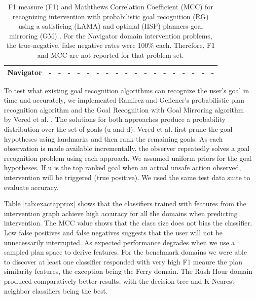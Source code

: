 \documentclass[letterpaper]{article}
\theoremstyle{plain}
\begin{document}
\begin{table}[tb]
{\begin{tabular}{|l|ll|ll|ll|ll|ll|ll|ll|ll|ll|}
\textbf{Navigator}                            & -                       & -                        & -                       & -   & -                       & -   & -                        & -   & -                       & -   & -                       & -   & -                        & -   & -                       & -   & -                       & -   \\ \hline
\end{tabular}%
}
\caption{F1 measure (F1) and Maththews Correlation Coefficient (MCC) for recognizing intervention with probabilistic goal recognition (RG)  \cite{ramirez2010probabilistic} using a satisficing (LAMA) and optimal (HSP) planners goal mirroring (GM) \cite{vered2018goalrec}. For the Navigator domain intervention problems, the true-negative, false negative rates were 100\%  each. Therefore, F1 and MCC are not reported for that problem set.}
\label{tab:rgv}
\end{table}

To test what existing goal recognition algorithms can recognize the user's goal in time and accurately, we implemented Ramirez and Geffener's probabilistic plan recognition algorithm \cite{ramirez2010probabilistic} and the Goal Recognition with Goal Mirroring algorithm by Vered et al. . The solutions for both approaches produce a probability distribution over the set of goals ($\mathrm{u}$ and $\mathrm{d}$). Vered et al. first prune the goal hypotheses using landmarks and then rank the remaining goals. As each observation is made available incrementally, the observer repeatedly solves a goal recognition problem using each approach. We assumed uniform priors for the goal hypotheses. If $\mathrm{u}$ is the top ranked goal when an actual unsafe action observed, intervention will be triggered (true positive). We used the same test data suite to evaluate accuracy.

Table \ref{tab:exactapprox} shows that the classifiers trained with features from the intervention graph achieve high accuracy for all the domains when predicting intervention. The MCC value shows that the class size does not bias the classifier. Low false positives and false negatives suggests that the user will not be unnecessarily interrupted. As expected performance degrades when we use a sampled plan space to derive features. For the benchmark domains we were able to discover at least one classifier responded with very high F1 meaure the plan similarity features, the exception being the Ferry domain. The Rush Hour domain produced comparatively better results, with the decision tree and K-Nearest neighbor classifiers being the best. 
\end{document}
